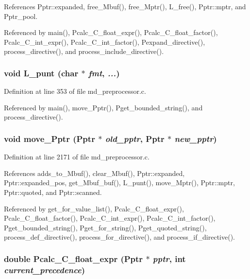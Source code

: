 References Pptr::expanded, free\_\-Mbuf(), free\_\-Mptr(), L\_\-free(), Pptr::mptr, and Pptr\_\-pool.

Referenced by main(), Pcalc\_\-C\_\-float\_\-expr(), Pcalc\_\-C\_\-float\_\-factor(), Pcalc\_\-C\_\-int\_\-expr(), Pcalc\_\-C\_\-int\_\-factor(), Pexpand\_\-directive(), process\_\-directive(), and process\_\-include\_\-directive().
\subsubsection{\setlength{\rightskip}{0pt plus 5cm}void L\_\-punt (char $\ast$ {\em fmt},  {\em ...})}\label{md__preprocessor_8h_c8ccfa451c1bd1740a1b720ba5b4c3a9}




Definition at line 353 of file md\_\-preprocessor.c.

Referenced by main(), move\_\-Pptr(), Pget\_\-bounded\_\-string(), and process\_\-directive().
\subsubsection{\setlength{\rightskip}{0pt plus 5cm}void move\_\-Pptr (\bf{Pptr} $\ast$ {\em old\_\-pptr}, \bf{Pptr} $\ast$ {\em new\_\-pptr})}\label{md__preprocessor_8h_657cab1ededb1d24f0f14f022bcd094d}




Definition at line 2171 of file md\_\-preprocessor.c.

References adds\_\-to\_\-Mbuf(), clear\_\-Mbuf(), Pptr::expanded, Pptr::expanded\_\-pos, get\_\-Mbuf\_\-buf(), L\_\-punt(), move\_\-Mptr(), Pptr::mptr, Pptr::quoted, and Pptr::scanned.

Referenced by get\_\-for\_\-value\_\-list(), Pcalc\_\-C\_\-float\_\-expr(), Pcalc\_\-C\_\-float\_\-factor(), Pcalc\_\-C\_\-int\_\-expr(), Pcalc\_\-C\_\-int\_\-factor(), Pget\_\-bounded\_\-string(), Pget\_\-for\_\-string(), Pget\_\-quoted\_\-string(), process\_\-def\_\-directive(), process\_\-for\_\-directive(), and process\_\-if\_\-directive().
\subsubsection{\setlength{\rightskip}{0pt plus 5cm}double Pcalc\_\-C\_\-float\_\-expr (\bf{Pptr} $\ast$ {\em pptr}, int {\em current\_\-precedence})}\label{md__preprocessor_8h_9f2325391833230381496bb431bd6787}




